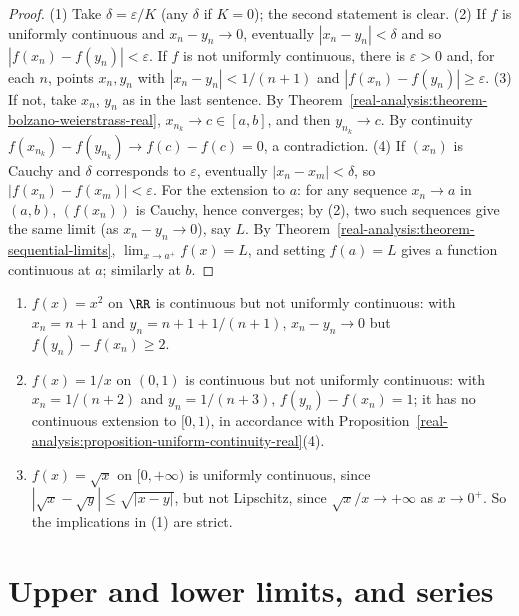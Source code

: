 \begin{proof}
(1) Take $\delta = \varepsilon/K$ (any $\delta$ if $K = 0$); the second statement is clear. (2) If $f$ is uniformly continuous and $x_n - y_n \to 0$, eventually $|x_n - y_n| < \delta$ and so $|f(x_n) - f(y_n)| < \varepsilon$.
If $f$ is not uniformly continuous, there is $\varepsilon > 0$ and, for each $n$, points $x_n, y_n$ with $|x_n - y_n| < 1/(n + 1)$ and $|f(x_n) - f(y_n)| \geq \varepsilon$. (3) If not, take $x_n$, $y_n$ as in the last
sentence. By Theorem~\ref{real-analysis:theorem-bolzano-weierstrass-real}, $x_{n_k} \to c \in [a, b]$, and then $y_{n_k} \to c$. By continuity $f(x_{n_k}) - f(y_{n_k}) \to f(c) - f(c) = 0$, a contradiction. (4) If
$(x_n)$ is Cauchy and $\delta$ corresponds to $\varepsilon$, eventually $|x_n - x_m| < \delta$, so $|f(x_n) - f(x_m)| < \varepsilon$. For the extension to $a$: for any sequence $x_n \to a$ in $(a, b)$, $(f(x_n))$ is Cauchy,
hence converges; by (2), two such sequences give the same limit (as $x_n - y_n \to 0$), say $L$. By Theorem~\ref{real-analysis:theorem-sequential-limits}, $\lim_{x \to a^+}f(x) = L$, and setting $f(a) = L$ gives a function
continuous at $a$; similarly at $b$.
\end{proof}

\begin{counterexample}\label{real-analysis:counterexample-uniform-continuity}
\begin{enumerate}
\item $f(x) = x^2$ on $\RR$ is continuous but not uniformly continuous: with $x_n = n + 1$ and $y_n = n + 1 + 1/(n+1)$, $x_n - y_n \to 0$ but $f(y_n) - f(x_n) \geq 2$.
\item $f(x) = 1/x$ on $(0, 1)$ is continuous but not uniformly continuous: with $x_n = 1/(n + 2)$ and $y_n = 1/(n + 3)$, $f(y_n) - f(x_n) = 1$; it has no continuous extension to $[0, 1)$, in accordance with
Proposition~\ref{real-analysis:proposition-uniform-continuity-real}(4).
\item $f(x) = \sqrt x$ on $[0, +\infty)$ is uniformly continuous, since $|\sqrt x - \sqrt y| \leq \sqrt{|x - y|}$, but not Lipschitz, since $\sqrt x/x \to +\infty$ as $x \to 0^+$. So the implications in (1) are strict.
\end{enumerate}
\end{counterexample}

\section{Upper and lower limits, and series}\label{real-analysis:section-series}


